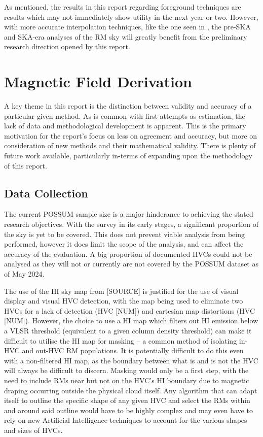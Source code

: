 As mentioned, the results in this report regarding foreground techniques are results which may not immediately show utility in the next year or two. However, with more accurate interpolation techniques, like the one seen in \cite{ID58}, the pre-SKA and SKA-era analyses of the RM sky will greatly benefit from the preliminary research direction opened by this report.

\section{Magnetic Field Derivation}
\label{sec:mag_disc}

A key theme in this report is the distinction between validity and accuracy of a particular given method. As is common with first attempts as estimation, the lack of data and methodological development is apparent. This is the primary motivation for the report's focus on less on agreement and accuracy, but more on consideration of new methods and their mathematical validity. There is plenty of future work available, particularly in-terms of expanding upon the methodology of this report.

\subsection{Data Collection}
\label{ssec:B1}

The current POSSUM sample size is a major hinderance to achieving the stated research objectives. With the survey in its early stages, a significant proportion of the sky is yet to be covered. This does not prevent viable analysis from being performed, however it does limit the scope of the analysis, and can affect the accuracy of the evaluation. A big proportion of documented HVCs could not be analysed as they will not or currently are not covered by the POSSUM dataset as of May 2024.


The use of the HI sky map from [SOURCE] is justified for the use of visual display and visual HVC detection, with the map being used to eliminate two HVCs for a lack of detection (HVC [NUM]) and cartesian map distortions (HVC [NUM]). However, the choice to use a HI map which filters out HI emission below a VLSR threshold (equivalent to a given column density threshold) can make it difficult to utilise the HI map for masking – a common method of isolating in-HVC and out-HVC RM populations. It is potentially difficult to do this even with a non-filtered HI map, as the boundary between what is and is not the HVC will always be difficult to discern. Masking would only be a first step, with the need to include RMs near but not on the HVC's HI boundary due to magnetic draping occurring outside the physical cloud itself. Any algorithm that can adapt itself to outline the specific shape of any given HVC and select the RMs within and around said outline would have to be highly complex and may even have to rely on new Artificial Intelligence techniques to account for the various shapes and sizes of HVCs.


